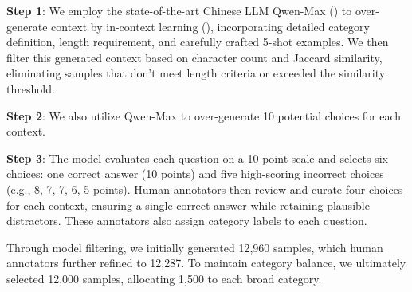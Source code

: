 \noindent %
\textbf{Step 1}: We employ the state-of-the-art Chinese LLM Qwen-Max (\citealp{yang2024qwen2}) to over-generate context by in-context learning (\citealp{brown2020language}), incorporating detailed category definition, length requirement, and carefully crafted 5-shot examples. We then filter this generated context based on character count and Jaccard similarity, eliminating samples that don't meet length criteria or exceeded the similarity threshold.

\noindent %
\textbf{Step 2}: We also utilize Qwen-Max to over-generate 10 potential choices for each context. 

\noindent %
\textbf{Step 3}: The model evaluates each question on a 10-point scale and selects six choices: one correct answer (10 points) and five high-scoring incorrect choices (e.g., 8, 7, 7, 6, 5 points). Human annotators then review and curate four choices for each context, ensuring a single correct answer while retaining plausible distractors. These annotators also assign category labels to each question.

Through model filtering, we initially generated 12,960 samples, which human annotators further refined to 12,287. To maintain category balance, we ultimately selected 12,000 samples, allocating 1,500 to each broad category.



